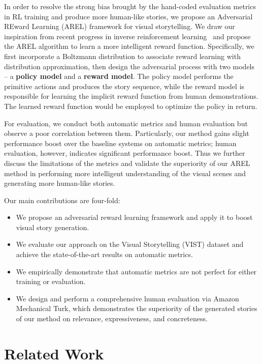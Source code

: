 \documentclass[11pt,a4paper]{article}
\begin{document}
In order to resolve the strong bias brought by the hand-coded evaluation metrics in RL training and produce more human-like stories, we propose an Adversarial REward Learning (AREL) framework for visual storytelling. We draw our inspiration from recent progress in inverse reinforcement learning~\cite{ho2016generative,finn2016connection,fu2017learning} and propose the AREL algorithm to learn a more intelligent reward function. Specifically, we first incorporate a Boltzmann distribution to associate reward learning with distribution approximation, then design the adversarial process with two models -- a \textbf{policy model} and a \textbf{reward model}. The policy model performs the primitive actions and produces the story sequence, while the reward model is responsible for learning the implicit reward function from human demonstrations. The learned reward function would be employed to optimize the policy in return. 

For evaluation, we conduct both automatic metrics and human evaluation but observe a poor correlation between them. Particularly, our method gains slight performance boost over the baseline systems on automatic metrics; human evaluation, however, indicates significant performance boost. Thus we further discuss the limitations of the metrics and validate the superiority of our AREL method in performing more intelligent understanding of the visual scenes and generating more human-like stories.

Our main contributions are four-fold:
\begin{itemize}
\item We propose an adversarial reward learning framework and apply it to boost visual story generation. 
\item We evaluate our approach on the Visual Storytelling (VIST) dataset and achieve the state-of-the-art results on automatic metrics.
\item We empirically demonstrate that automatic metrics are not perfect for either training or evaluation.
\item We design and perform a comprehensive human evaluation via Amazon Mechanical Turk, which demonstrates the superiority of the generated stories of our method on relevance, expressiveness, and concreteness.
\end{itemize}

\section{Related Work}
\end{document}
